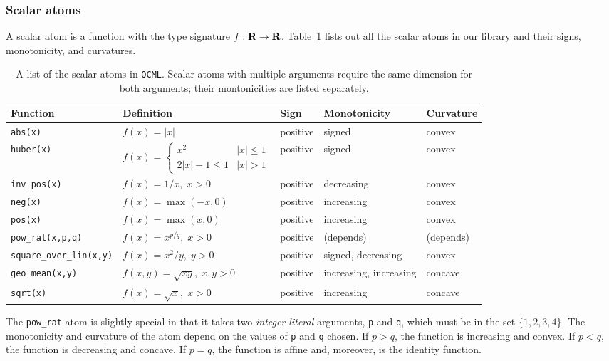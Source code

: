 \documentclass[11pt]{article}
\def\qcml{\texttt{QCML}\xspace}
\newcommand{\reals}{{\mbox{\bf R}}}
\begin{document}
\subsubsection{Scalar atoms}
A scalar atom is a function with the type signature $f : \reals \to \reals$.
Table~\ref{t-scalar-atoms} lists out all the scalar atoms in our library
and their signs, monotonicity, and curvatures.
\begin{table}
  \small
  \renewcommand{\arraystretch}{1.5}
  \centering
\begin{tabular}{|l|l||l|l|l|} \hline
  Function & Definition & Sign & Monotonicity & Curvature \\ \hline
  {\tt abs(x)} & $f(x) = |x|$ & positive & signed & convex \\ \hline
  {\tt huber(x)} & $f(x) = \begin{cases} x^2 & |x| \leq 1 \\
    2|x| - 1 \leq 1 & |x| > 1 \end{cases}$ & positive & signed & convex \\ \hline
  {\tt inv\_pos(x)} & $f(x) = 1/x, \; x > 0$ & positive & decreasing & convex \\ \hline
  {\tt neg(x)} & $f(x) = \max(-x, 0)$ & positive & increasing & convex \\ \hline
  {\tt pos(x)} & $f(x) = \max(x, 0)$ & positive & increasing & convex \\ \hline
  {\tt pow\_rat(x,p,q)} & $f(x) = x^{p/q}, \; x >0$ & positive & (depends) & (depends) \\ \hline
  {\tt square\_over\_lin(x,y)} & $f(x) = x^2/y, \; y >0$ & positive & signed, decreasing & convex\\ \hline
  {\tt geo\_mean(x,y)} & $f(x,y) = \sqrt{xy}, \; x,y >0$ & positive & increasing, increasing & concave \\ \hline
  {\tt sqrt(x)} & $f(x) = \sqrt{x}, \; x >0$ & positive & increasing & concave \\ \hline
\end{tabular}
\caption{A list of the scalar atoms in \qcml. Scalar atoms with multiple arguments
require the same dimension for both arguments; their montonicities are listed separately.}
\label{t-scalar-atoms}
\end{table}

The {\tt pow\_rat} atom is slightly special in that it takes two \emph{integer
literal} arguments, {\tt p} and {\tt q}, which must be in the set $\{1,2,3,4\}$.
The monotonicity and curvature of the atom depend on the values of {\tt p}
and {\tt q} chosen. If $p > q$, the function is increasing and convex.
If $p < q$, the function is decreasing and concave. If $p = q$, the function
is affine and, moreover, is the identity function.
\end{document}
